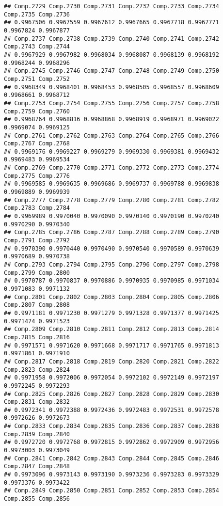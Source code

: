 \documentclass[
]{article}
\begin{document}
\begin{verbatim}
## Comp.2729 Comp.2730 Comp.2731 Comp.2732 Comp.2733 Comp.2734 Comp.2735 Comp.2736 
## 0.9967506 0.9967559 0.9967612 0.9967665 0.9967718 0.9967771 0.9967824 0.9967877 
## Comp.2737 Comp.2738 Comp.2739 Comp.2740 Comp.2741 Comp.2742 Comp.2743 Comp.2744 
## 0.9967929 0.9967982 0.9968034 0.9968087 0.9968139 0.9968192 0.9968244 0.9968296 
## Comp.2745 Comp.2746 Comp.2747 Comp.2748 Comp.2749 Comp.2750 Comp.2751 Comp.2752 
## 0.9968349 0.9968401 0.9968453 0.9968505 0.9968557 0.9968609 0.9968661 0.9968712 
## Comp.2753 Comp.2754 Comp.2755 Comp.2756 Comp.2757 Comp.2758 Comp.2759 Comp.2760 
## 0.9968764 0.9968816 0.9968868 0.9968919 0.9968971 0.9969022 0.9969074 0.9969125 
## Comp.2761 Comp.2762 Comp.2763 Comp.2764 Comp.2765 Comp.2766 Comp.2767 Comp.2768 
## 0.9969176 0.9969227 0.9969279 0.9969330 0.9969381 0.9969432 0.9969483 0.9969534 
## Comp.2769 Comp.2770 Comp.2771 Comp.2772 Comp.2773 Comp.2774 Comp.2775 Comp.2776 
## 0.9969585 0.9969635 0.9969686 0.9969737 0.9969788 0.9969838 0.9969889 0.9969939 
## Comp.2777 Comp.2778 Comp.2779 Comp.2780 Comp.2781 Comp.2782 Comp.2783 Comp.2784 
## 0.9969989 0.9970040 0.9970090 0.9970140 0.9970190 0.9970240 0.9970290 0.9970340 
## Comp.2785 Comp.2786 Comp.2787 Comp.2788 Comp.2789 Comp.2790 Comp.2791 Comp.2792 
## 0.9970390 0.9970440 0.9970490 0.9970540 0.9970589 0.9970639 0.9970689 0.9970738 
## Comp.2793 Comp.2794 Comp.2795 Comp.2796 Comp.2797 Comp.2798 Comp.2799 Comp.2800 
## 0.9970787 0.9970837 0.9970886 0.9970935 0.9970985 0.9971034 0.9971083 0.9971132 
## Comp.2801 Comp.2802 Comp.2803 Comp.2804 Comp.2805 Comp.2806 Comp.2807 Comp.2808 
## 0.9971181 0.9971230 0.9971279 0.9971328 0.9971377 0.9971425 0.9971474 0.9971523 
## Comp.2809 Comp.2810 Comp.2811 Comp.2812 Comp.2813 Comp.2814 Comp.2815 Comp.2816 
## 0.9971571 0.9971620 0.9971668 0.9971717 0.9971765 0.9971813 0.9971861 0.9971910 
## Comp.2817 Comp.2818 Comp.2819 Comp.2820 Comp.2821 Comp.2822 Comp.2823 Comp.2824 
## 0.9971958 0.9972006 0.9972054 0.9972102 0.9972149 0.9972197 0.9972245 0.9972293 
## Comp.2825 Comp.2826 Comp.2827 Comp.2828 Comp.2829 Comp.2830 Comp.2831 Comp.2832 
## 0.9972341 0.9972388 0.9972436 0.9972483 0.9972531 0.9972578 0.9972626 0.9972673 
## Comp.2833 Comp.2834 Comp.2835 Comp.2836 Comp.2837 Comp.2838 Comp.2839 Comp.2840 
## 0.9972720 0.9972768 0.9972815 0.9972862 0.9972909 0.9972956 0.9973003 0.9973049 
## Comp.2841 Comp.2842 Comp.2843 Comp.2844 Comp.2845 Comp.2846 Comp.2847 Comp.2848 
## 0.9973096 0.9973143 0.9973190 0.9973236 0.9973283 0.9973329 0.9973376 0.9973422 
## Comp.2849 Comp.2850 Comp.2851 Comp.2852 Comp.2853 Comp.2854 Comp.2855 Comp.2856 

\end{verbatim}
\end{document}
